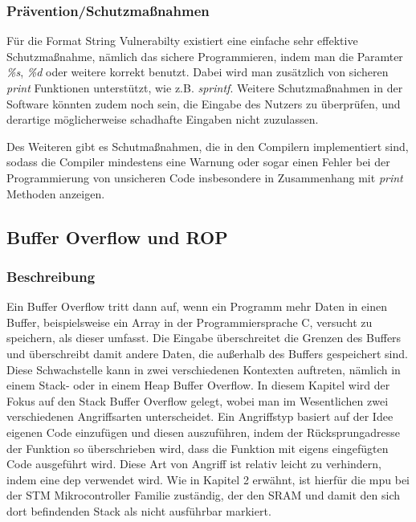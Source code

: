 \documentclass[a4paper,
DIV=13,
12pt,
BCOR=10mm,
department=FakIM,
oneside,
parskip=half,
automark,
listof=totocnumbered,
bibliography=totocnumbered,
acronym=totocnumbered
] {OTHRartcl}
\begin{document}
\subsubsection{Prävention/Schutzmaßnahmen}
Für die Format String Vulnerabilty existiert eine einfache sehr effektive Schutzmaßnahme, nämlich
das sichere Programmieren, indem man die Paramter \textit{\%s}, \textit{\%d} oder weitere korrekt benutzt.
Dabei wird man zusätzlich von sicheren \textit{print} Funktionen unterstützt, wie z.B. \textit{sprintf}.
Weitere Schutzmaßnahmen in der Software könnten zudem noch sein, die Eingabe des Nutzers zu überprüfen, und
derartige möglicherweise schadhafte Eingaben nicht zuzulassen.

Des Weiteren gibt es Schutmaßnahmen, die in den Compilern implementiert sind, sodass die Compiler mindestens eine Warnung oder sogar einen Fehler
bei der Programmierung von unsicheren Code insbesondere in Zusammenhang mit \textit{print} Methoden anzeigen. \cite{OWASP Format String Vuln.}

\subsection{Buffer Overflow und ROP}
\subsubsection{Beschreibung}
Ein Buffer Overflow tritt dann auf, wenn ein Programm mehr Daten in einen Buffer, beispielsweise ein Array in der Programmiersprache C, versucht zu speichern, als
dieser umfasst. \cite{OWASP Buffer Overflow}
Die Eingabe überschreitet die Grenzen des Buffers und überschreibt damit andere Daten, die außerhalb des Buffers gespeichert sind.
Diese Schwachstelle kann in zwei verschiedenen Kontexten auftreten, nämlich in einem Stack- oder in einem Heap Buffer Overflow.
In diesem Kapitel wird der Fokus auf den Stack Buffer Overflow gelegt, wobei man im Wesentlichen zwei verschiedenen Angriffsarten unterscheidet.
Ein Angriffstyp basiert auf der Idee eigenen Code einzufügen und diesen auszuführen, indem der Rücksprungadresse der Funktion so überschrieben wird, dass die Funktion
mit eigens eingefügten Code ausgeführt wird. Diese Art von Angriff ist relativ leicht zu verhindern, indem eine \ac{dep} verwendet wird. \cite{IEEE Xplore ROP}
Wie in Kapitel 2 erwähnt, ist hierfür die \ac{mpu} bei der STM Mikrocontroller Familie zuständig, der den SRAM und damit den sich dort befindenden Stack als nicht ausführbar markiert.
\end{document}
